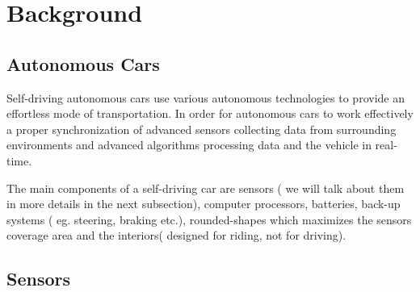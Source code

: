 \section{Background}
\subsection{ Autonomous Cars}
Self-driving autonomous cars use various autonomous technologies to provide an effortless mode of transportation. In order for autonomous cars to work effectively a proper synchronization of advanced sensors collecting data from surrounding environments and advanced algorithms processing data and the vehicle in real-time.

The main components of a self-driving car are sensors ( we will talk about them in more details in the next subsection), computer processors, batteries, back-up systems ( eg. steering, braking etc.), rounded-shapes which maximizes the sensors coverage area and the interiors( designed for riding, not for driving). 

\subsection{Sensors}

